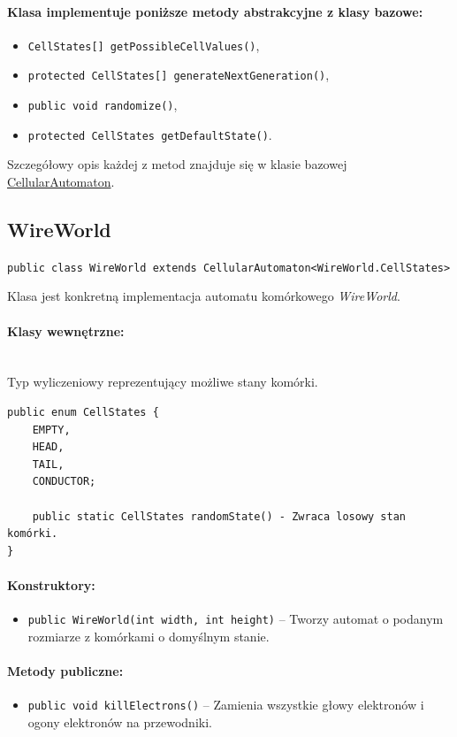 \documentclass{report}
\begin{document}
\paragraph{Klasa implementuje poniższe metody abstrakcyjne z klasy bazowe:}
\begin{itemize}
    \item \texttt{CellStates[] getPossibleCellValues()},
    \item \texttt{protected CellStates[] generateNextGeneration()},
    \item \texttt{public void randomize()},
    \item \texttt{protected CellStates getDefaultState()}.
\end{itemize}
Szczegółowy opis każdej z metod znajduje się w klasie bazowej \hyperref[subsec:cellularAutomaton]{CellularAutomaton}.

\subsection{WireWorld}
\texttt{public class WireWorld extends CellularAutomaton<WireWorld.CellStates>}

Klasa jest konkretną implementacja automatu komórkowego \textit{WireWorld}.

\paragraph{Klasy wewnętrzne:} \mbox{} \\
Typ wyliczeniowy reprezentujący możliwe stany komórki.
\begin{verbatim}
public enum CellStates {
    EMPTY,
    HEAD,
    TAIL,
    CONDUCTOR;

    public static CellStates randomState() - Zwraca losowy stan komórki.
}
\end{verbatim}

\paragraph{Konstruktory:}
\begin{itemize}
	\item \texttt{public WireWorld(int width, int height)} -- Tworzy automat o podanym rozmiarze z komórkami o domyślnym stanie.
\end{itemize}

\paragraph{Metody publiczne:}
\begin{itemize}
    \item \texttt{public void killElectrons()} -- Zamienia wszystkie głowy elektronów i ogony elektronów na przewodniki.
\end{itemize}
\end{document}

